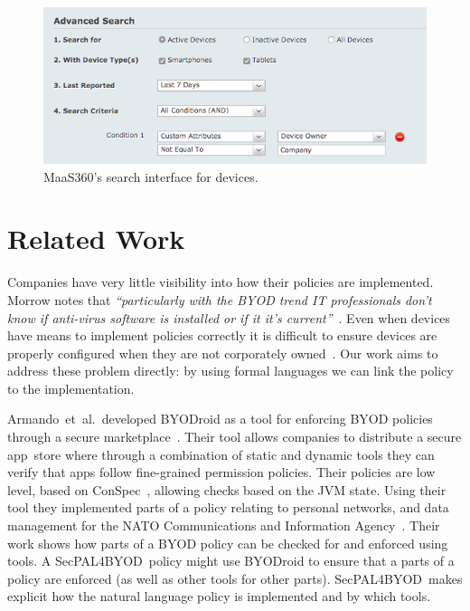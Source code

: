 \documentclass{llncs}
\makeatletter
\newcommand{\etal}{et~al.\@}
\newcommand{\AppPAL}[0]{SecPAL4BYOD}
\makeatother
\begin{document}
\begin{figure}\centering
  \includegraphics[width=\linewidth]{figures/maas-groupsearch.png}
  \caption{MaaS360's search interface for devices.}
  \label{fig:maas360search}
\end{figure}

\section{Related Work}
\label{sec:related}

Companies have very little visibility into how their policies are implemented.
Morrow notes that \emph{``particularly with the BYOD trend IT professionals don't know if anti-virus software is installed or if it it's current''}~\cite{morrow_byod_2012}.
Even when devices have means to implement policies correctly it is difficult to ensure devices are properly configured when they are not corporately owned~\cite{tokuyoshi_security_2013}.
Our work aims to address these problem directly: by using formal languages we can link the policy to the implementation.

Armando~\etal~developed BYODroid as a tool for enforcing BYOD policies through a secure marketplace~\cite{armando_enabling_2014}.
Their tool allows companies to distribute a secure app~store where through a combination of static and dynamic tools they can verify that apps follow fine-grained permission policies.
Their policies are low level, based on ConSpec~\cite{aktug_conspec_2008}, allowing checks based on the JVM state.
Using their tool they implemented parts of a policy relating to personal networks, and data management for the NATO Communications and Information Agency~\cite{armando_developing_2016}.
Their work shows how parts of a BYOD policy can be checked for and enforced using tools.
A \AppPAL~policy might use BYODroid to ensure that a parts of a policy are enforced (as well as other tools for other parts).
\AppPAL~makes explicit how the natural language policy is implemented and by which tools.
\end{document}
